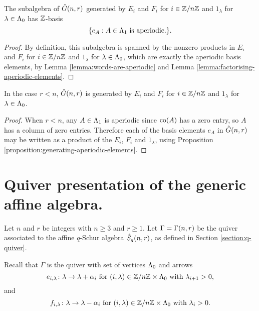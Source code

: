 \documentclass[a4paper, 11pt, twoside]{report}
\begin{document}
\begin{proposition}\label{proposition:generating-aperiodic-elements}
The subalgebra of $\hat{G}(n,r)$ generated by $E_i$ and $F_i$ for $i\in\mathbb{Z}/{n \mathbb{Z}}$ and $1_\lambda$ for $\lambda\in\Lambda_0{}$ has $\mathbb{Z}$-basis
\begin{equation*}
\{e_A:A\in\Lambda_1{}\text{ is aperiodic.}\}.
\end{equation*}
\end{proposition}

\begin{proof}
By definition, this subalgebra is spanned by the nonzero products in $E_i$ and $F_i$ for $i\in\mathbb{Z}/{n \mathbb{Z}}$ and $1_\lambda$ for $\lambda\in\Lambda_0{}$, which are exactly the aperiodic basis elements, by Lemma \ref{lemma:words-are-aperiodic} and Lemma \ref{lemma:factorising-aperiodic-elements}.
\end{proof}

\begin{lemma}
In the case $r<n$, $\hat{G}(n,r)$ is generated by $E_i$ and $F_i$ for $i\in\mathbb{Z}/{n \mathbb{Z}}$ and $1_\lambda$ for $\lambda\in\Lambda_0{}$.
\end{lemma}

\begin{proof}
When $r<n$, any $A\in\Lambda_1{}$ is aperiodic since $\operatorname{co}(A)$ has a zero entry, so $A$ has a column of zero entries. Therefore each of the basis elements $e_A$ in $\hat{G}(n,r)$ may be written as a product of the $E_i$, $F_i$ and $1_\lambda$, using Proposition \ref{proposition:generating-aperiodic-elements}.
\end{proof}


\section{Quiver presentation of the generic affine algebra.}

Let $n$ and $r$ be integers with $n\geq 3$ and $r\geq 1$. Let $\Gamma=\Gamma(n,r)$ be the quiver associated to the affine $q$-Schur algebra $\hat{S}_q(n,r)$, as defined in Section \ref{section:q-quiver}. 

Recall that $\Gamma$ is the quiver with set of vertices $\Lambda_0{}$ and arrows
\begin{equation*}
e_{i,\lambda}\colon\lambda\to\lambda+\alpha_i \text{ for } (i,\lambda)\in\mathbb{Z}/{n \mathbb{Z}}\times\Lambda_0{} \text{ with } \lambda_{i+1}>0,
\end{equation*}
and
\begin{equation*}
f_{i,\lambda}\colon\lambda\to\lambda-\alpha_i \text{ for } (i,\lambda)\in\mathbb{Z}/{n \mathbb{Z}}\times\Lambda_0{} \text{ with } \lambda_i>0.
\end{equation*}
\end{document}
